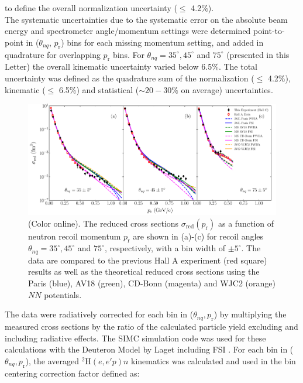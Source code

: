 \documentclass[aps,prl,twocolumn,showpacs,superscriptaddress,groupedaddress,nofootinbib]{revtex4-2}  %
\begin{document}
to define the overall normalization uncertainty ($\leq$ 4.2$\%$).\\
\indent The systematic uncertainties due to the systematic error on the absolute beam energy and spectrometer angle/momentum settings were
determined point-to-point in ($\theta_{nq}$, $p_{\mathrm{r}}$) bins for each missing momentum setting, and added in quadrature for overlapping $p_{\mathrm{r}}$ bins. 
For $\theta_{nq}= 35^{\circ}, 45^{\circ}$ and $75^{\circ}$ (presented in this Letter) the overall kinematic uncertainty varied below 6.5$\%$.
The total uncertainty was defined as the quadrature sum of the normalization ($\leq$ 4.2$\%$), kinematic ($\leq$ 6.5$\%$) and statistical ($\sim20-30\%$ on average) uncertainties.\\
\begin{figure}[t]
\centering        
\includegraphics[scale=0.45]{PRL_plot1.pdf}
\caption{(Color online). The reduced cross sections $\sigma_{\mathrm{red}}(p_{\mathrm{r}})$ as a function of neutron recoil momentum $p_{\mathrm{r}}$ are shown in (a)-(c) for recoil angles $\theta_{nq}=35^{\circ}, 45^{\circ}$ and $75^{\circ}$, respectively,
with a bin width of $\pm 5^{\circ}$. The data are compared to the previous Hall A experiment (red square) results \cite{PhysRevLett.107.262501} as well as the theoretical reduced cross sections using the Paris (blue),
AV18 (green), CD-Bonn (magenta) and WJC2 (orange) $NN$ potentials.}
\label{fig:fig1}
\end{figure}
\indent The data were radiatively corrected for each bin in ($\theta_{nq}, p_{\mathrm{r}}$) by multiplying the measured cross sections by the ratio of the calculated particle yield excluding and including radiative effects. The SIMC simulation code was used for these calculations with the Deuteron Model by Laget including FSI \cite{LAGET2005}.
For each bin in ($\theta_{nq}, p_{\mathrm{r}}$), the averaged $^{2}\mathrm{H}(e,e'p)n$ kinematics was calculated and used in the bin centering correction factor defined as:
\end{document}

